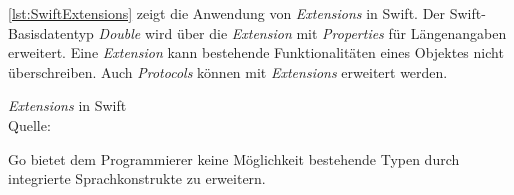 \autoref{lst:SwiftExtensions} zeigt die Anwendung von \textit{Extensions} in Swift.
Der Swift-Basisdatentyp \textit{Double} wird über die \textit{Extension} mit \textit{Properties} für Längenangaben erweitert.
Eine \textit{Extension} kann bestehende Funktionalitäten eines Objektes nicht überschreiben.
Auch \textit{Protocols} können mit \textit{Extensions} erweitert werden.

\begin{listing}
\caption{\textit{Extensions} in Swift \\ Quelle:\cite[S.332f]{Apple.2017}}
\label{lst:SwiftExtensions}
\end{listing}

Go bietet dem Programmierer keine Möglichkeit bestehende Typen durch integrierte Sprachkonstrukte zu erweitern. 